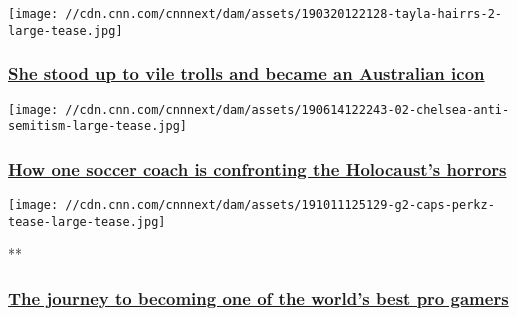 \href{/2020/03/05/sport/tayla-harris-kick-aflw-spt-int/index.html}{}

\texttt{[image: //cdn.cnn.com/cnnnext/dam/assets/190320122128-tayla-hairrs-2-large-tease.jpg]}

\hypertarget{she-stood-up-to-vile-trolls-and-became-an-australian-icon}{%
\subsubsection{\texorpdfstring{\href{/2020/03/05/sport/tayla-harris-kick-aflw-spt-int/index.html}{She
stood up to vile trolls and became an Australian
icon}}{She stood up to vile trolls and became an Australian icon}}\label{she-stood-up-to-vile-trolls-and-became-an-australian-icon}}

\href{https://edition.cnn.com/interactive/2019/06/sport/antisemitism-soccer-chelsea-spt-intl/}{}

\texttt{[image: //cdn.cnn.com/cnnnext/dam/assets/190614122243-02-chelsea-anti-semitism-large-tease.jpg]}

\hypertarget{how-one-soccer-coach-is-confronting-the-holocausts-horrors}{%
\subsubsection{\texorpdfstring{\href{https://edition.cnn.com/interactive/2019/06/sport/antisemitism-soccer-chelsea-spt-intl/}{How
one soccer coach is confronting the Holocaust's
horrors}}{How one soccer coach is confronting the Holocaust's horrors}}\label{how-one-soccer-coach-is-confronting-the-holocausts-horrors}}

\href{/videos/sports/2019/10/11/perkz-caps-g2-esports-league-of-legends-world-championships-europe-spt-intl-lon-orig.cnn}{}

\texttt{[image: //cdn.cnn.com/cnnnext/dam/assets/191011125129-g2-caps-perkz-tease-large-tease.jpg]}

**

\hypertarget{the-journey-to-becoming-one-of-the-worlds-best-pro-gamers}{%
\subsubsection{\texorpdfstring{\href{/videos/sports/2019/10/11/perkz-caps-g2-esports-league-of-legends-world-championships-europe-spt-intl-lon-orig.cnn}{The
journey to becoming one of the world's best pro
gamers}}{The journey to becoming one of the world's best pro gamers}}\label{the-journey-to-becoming-one-of-the-worlds-best-pro-gamers}}

